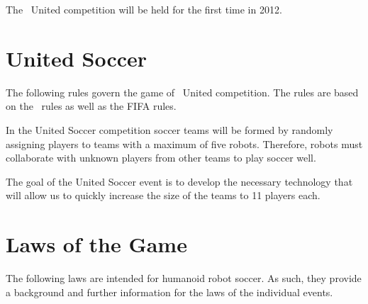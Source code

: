 \documentclass[12pt]{hurocup}
\begin{document}
The \HuroCup\ United competition will be held for the first time in
2012.

\newpage

\section{United Soccer}
\label{sec:soccer}

The following rules govern the game of \HuroCup\ United
competition. The rules are based on the \HuroCup\ rules as well as the
FIFA rules.

In the United Soccer competition soccer teams will be formed by
randomly assigning players to teams with a maximum of five
robots. Therefore, robots must collaborate with unknown players from
other teams to play soccer well.

The goal of the United Soccer event is to develop the necessary
technology that will allow us to quickly increase the size of the
teams to 11 players each.

\section{Laws of the Game}
\label{sec:laws}

The following laws are intended for humanoid robot soccer. As such,
they provide a background and further information for the laws of the
individual events.

\label{law:field-of-play}
\end{document}
